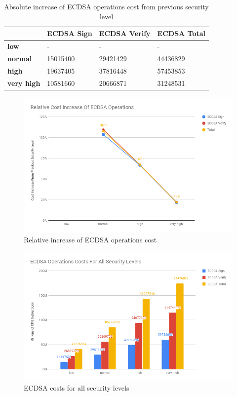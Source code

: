\documentclass{llncs}
\begin{document}
\begin{table}[]
\begin{tabular}{|l|l|l|l|}
\hline
                   & \textbf{ECDSA Sign} & \textbf{ECDSA Verify} & \textbf{ECDSA Total} \\ \hline
\textbf{low}       & -                   & -                     & -                    \\ \hline
\textbf{normal}    & 15015400            & 29421429              & 44436829             \\ \hline
\textbf{high}      & 19637405            & 37816448              & 57453853             \\ \hline
\textbf{very high} & 10581660            & 20666871              & 31248531             \\ \hline
\end{tabular}
\caption{\label{table:ecdsa-absolute-cost-increase} Absolute increase of ECDSA operations cost from previous security level}
\end{table}

\begin{figure}
  \centering
  \includegraphics[width=1.0\textwidth]{img/ecdsa_realtive_cost_increase.png}
  \caption{\label{fig:ecdsa-relative-cost-incerase} Relative increase of ECDSA operations cost}
\end{figure}

\begin{figure}
  \centering
  \includegraphics[width=1.0\textwidth]{img/ecdsa-cost-all-sls.png}
  \caption{\label{fig:ecdsa-costs-all-sls} ECDSA costs for all security levels}
\end{figure}
\end{document}
